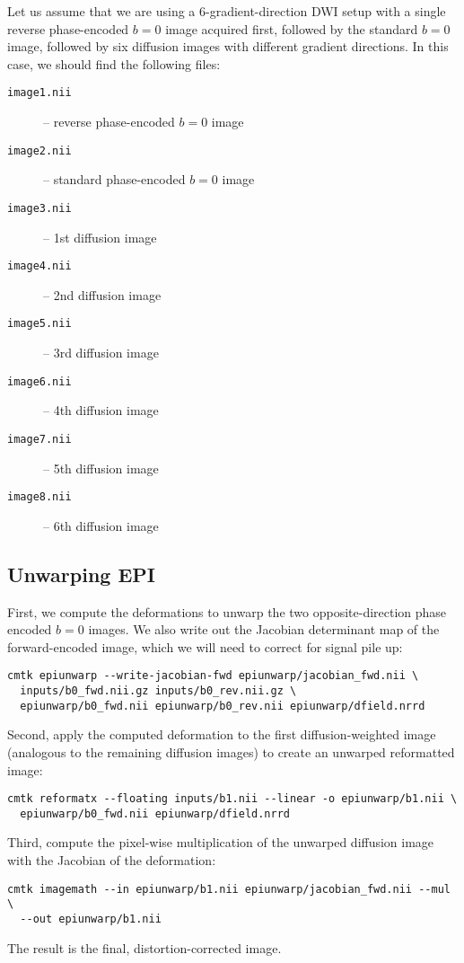 \documentclass{InsightArticle}
\begin{document}
Let us assume that we are using a 6-gradient-direction DWI setup with a single
reverse phase-encoded $b=0$ image acquired first, followed by the standard
$b=0$ image, followed by six diffusion images with different gradient
directions. In this case, we should find the following files:
\begin{description}
\item[\tt image1.nii] -- reverse phase-encoded $b=0$ image
\item[\tt image2.nii] -- standard phase-encoded $b=0$ image
\item[\tt image3.nii] -- 1st diffusion image
\item[\tt image4.nii] -- 2nd diffusion image
\item[\tt image5.nii] -- 3rd diffusion image
\item[\tt image6.nii] -- 4th diffusion image
\item[\tt image7.nii] -- 5th diffusion image
\item[\tt image8.nii] -- 6th diffusion image
\end{description}

\subsection{Unwarping EPI}

First, we compute the deformations to unwarp the two opposite-direction phase
encoded $b=0$ images. We also write out the Jacobian determinant map of the
forward-encoded image, which we will need to correct for signal pile up:
\begin{verbatim}
cmtk epiunwarp --write-jacobian-fwd epiunwarp/jacobian_fwd.nii \
  inputs/b0_fwd.nii.gz inputs/b0_rev.nii.gz \
  epiunwarp/b0_fwd.nii epiunwarp/b0_rev.nii epiunwarp/dfield.nrrd
\end{verbatim}
Second, apply the computed deformation to the first diffusion-weighted image
(analogous to the remaining diffusion images) to create an unwarped
reformatted image:
\begin{verbatim}
cmtk reformatx --floating inputs/b1.nii --linear -o epiunwarp/b1.nii \
  epiunwarp/b0_fwd.nii epiunwarp/dfield.nrrd
\end{verbatim}
Third, compute the pixel-wise multiplication of the unwarped diffusion image
with the Jacobian of the deformation:
\begin{verbatim}
cmtk imagemath --in epiunwarp/b1.nii epiunwarp/jacobian_fwd.nii --mul \
  --out epiunwarp/b1.nii
\end{verbatim}
The result is the final, distortion-corrected image.
\end{document}
